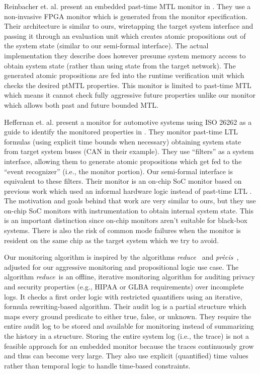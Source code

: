 \documentclass[]{llncs}
\newcommand{\precis}{\textit{pr\`ecis}}
\newcommand{\greduce}{\textit{reduce}}
\begin{document}
Reinbacher et. al. present an embedded past-time MTL monitor in \cite{Reinbacher2013}. They use a non-invasive FPGA monitor which is generated from the monitor specification. Their architecture is similar to ours, wiretapping the target system interface and passing it through an evaluation unit which creates atomic propositions out of the system state (similar to our semi-formal interface). The actual implementation they describe does however presume system memory access to obtain system state (rather than using state from the target network). The generated atomic propositions are fed into the runtime verification unit which checks the desired ptMTL properties. This monitor is limited to past-time MTL which means it cannot check fully aggressive future properties unlike our monitor which allows both past and future bounded MTL.

Heffernan et. al. present a monitor for automotive systems using ISO 26262 as a guide to identify the monitored properties in \cite{Heffernan2014}. They monitor past-time LTL formulas (using explicit time bounds when necessary) obtaining system state from target system buses (CAN in their example). They use ``filters'' as a system interface, allowing them to generate atomic propositions which get fed to the ``event recognizer'' (i.e., the monitor portion). Our semi-formal interface is equivalent to these filters. 
Their monitor is an on-chip SoC monitor based on previous work which used an informal hardware logic instead of past-time LTL \cite{Heffernan2009}.
%
The motivation and goals behind that work are very similar to ours, but they use on-chip SoC monitors with instrumentation to obtain internal system state. This is an important distinction since on-chip monitors aren't suitable for black-box systems. There is also the risk of common mode failures when the monitor is resident on the same chip as the target system which we try to avoid.

Our monitoring algorithm is inspired by the algorithms \greduce\ \cite{Garg2011} and \precis\ \cite{Chowdhury2014}, adjusted for our aggressive monitoring and propositional logic use case. 
%
The algorithm \greduce\ is an offline, iterative monitoring algorithm for auditing privacy and security properties (e.g., HIPAA \cite{HIPAA2002} or GLBA \cite{GLBA1999} requirements) over incomplete logs. It checks a first order logic with restricted quantifiers \cite{Garg2011} using an iterative, formula rewriting-based algorithm.
Their audit log is a partial structure which maps every ground predicate to either true, false, or unknown.
They require the entire audit log to be stored and available for monitoring instead of summarizing the history in a structure.
Storing the entire system log (i.e., the trace) is not a feasible approach for an embedded monitor because the traces continuously grow and thus can become very large.
%
They also use explicit (quantified) time values rather than temporal logic to handle time-based constraints. 
\end{document}
